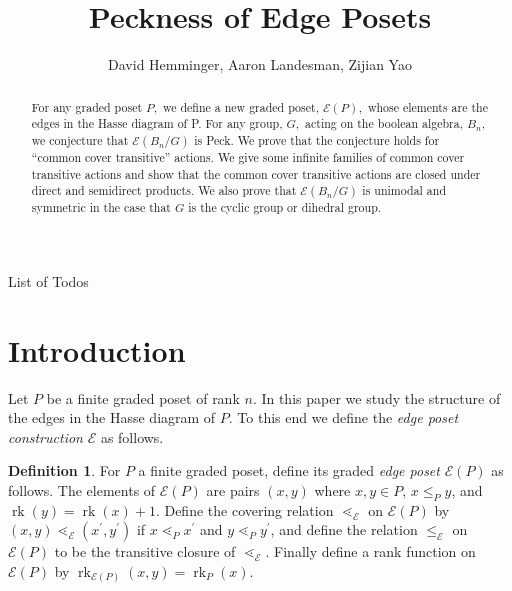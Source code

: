 \documentclass[10 pt]{amsart}
\title{Peckness of Edge Posets}
\author{David Hemminger, Aaron Landesman, Zijian Yao}
\makeatletter
\theoremstyle{plain}
\theoremstyle{definition}
\newtheorem{defn}[thm]{Definition}
\theoremstyle{remark}
\numberwithin{equation}{section}
\newcommand\rk{\operatorname{rk}}
\def\listtodoname{List of Todos}
\def\listoftodos{\@starttoc{tdo}\listtodoname}
\makeatother
\begin{document}
\begin{abstract}
For any graded poset $P,$ we define a new graded poset, $\mathcal E(P),$ whose elements are the edges in the Hasse diagram of P. For any group, $G,$ acting on the boolean algebra, $B_n,$ we conjecture that $\mathcal E(B_n/G)$ is Peck. We prove that the conjecture holds for ``common cover transitive'' actions. We give some infinite families of common cover transitive actions and show that the common cover transitive actions are closed under direct and semidirect products. We also prove that $\mathcal E(B_n/G)$ is unimodal and symmetric in the case that $G$ is the cyclic group or dihedral group.
\end{abstract}

\maketitle

\tableofcontents
\newpage

\listoftodos
\newpage


\section{Introduction}\label{sec:introduction}

Let $P$ be a finite graded poset of rank $n$.  In this paper we study the structure of the edges in the Hasse diagram of $P$.  To this end we define the \textit{edge poset construction} $\mathcal{E}$ as follows.

\begin{defn}
\label{defn:functor_of_edges}
For $P$ a finite graded poset, define its graded \textit{edge poset} $\mathcal{E}(P)$ as follows.  The elements of $\mathcal E(P)$ are pairs $(x,y)$ where $x,y\in P$, $x\le_P y$, and $\rk(y) = \rk(x) + 1$. Define the covering relation $\lessdot_{\mathcal E}$ on $\mathcal E(P)$ by $(x, y) \lessdot_{\mathcal E} (x^\prime, y^\prime)$ if $x\lessdot_P x^\prime$ and $y\lessdot_P y^\prime$, and define the relation $\le_{\mathcal E}$ on $\mathcal E(P)$ to be the transitive closure of $\lessdot_{\mathcal E}$.  Finally define a rank function on $\mathcal{E}(P)$ by $\rk_{\mathcal{E}(P)}(x,y) = \rk_P(x)$.
\end{defn}
\end{document}

